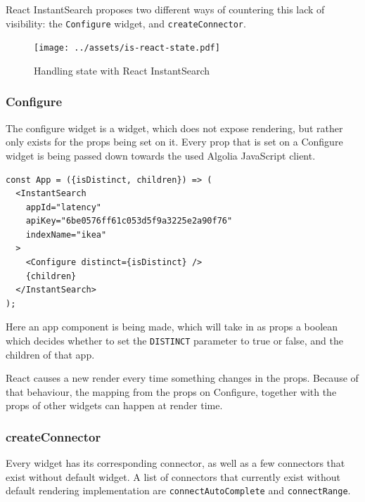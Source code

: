 React InstantSearch proposes two different ways of countering this lack of visibility: the {\tt Configure} widget, and {\tt createConnector}.

\begin{figure}[H]
  \centering
  \texttt{[image: ../assets/is-react-state.pdf]}
  \caption{Handling state with React InstantSearch}
  \label{figure:is-react-state}
\end{figure} %

\subsubsection{Configure}
\label{ssub:ris-configure}

The configure widget is a widget, which does not expose rendering, but rather only exists for the \gls{props} being set on it. Every prop that is set on a Configure widget is being passed down towards the used Algolia JavaScript client.

\begin{minipage}{\linewidth}
\begin{lstlisting}[caption={Configure in an InstantSearch container},label={lst:ris-configure}]
const App = ({isDistinct, children}) => (
  <InstantSearch
    appId="latency"
    apiKey="6be0576ff61c053d5f9a3225e2a90f76"
    indexName="ikea"
  >
    <Configure distinct={isDistinct} />
    {children}
  </InstantSearch>
);
\end{lstlisting}
\end{minipage}

Here an app component is being made, which will take in as \gls{props} a boolean which decides whether to set the {\tt DISTINCT} parameter to true or false, and the children of that app.

React causes a new render every time something changes in the \gls{props}. Because of that behaviour, the mapping from the \gls{props} on Configure, together with the \gls{props} of other widgets can happen at render time.

\subsubsection{createConnector}
\label{ssub:ris-createconnector}

Every widget has its corresponding connector, as well as a few connectors that exist without default widget. A list of connectors that currently exist without default rendering implementation are {\tt connectAutoComplete} and {\tt connectRange}.

